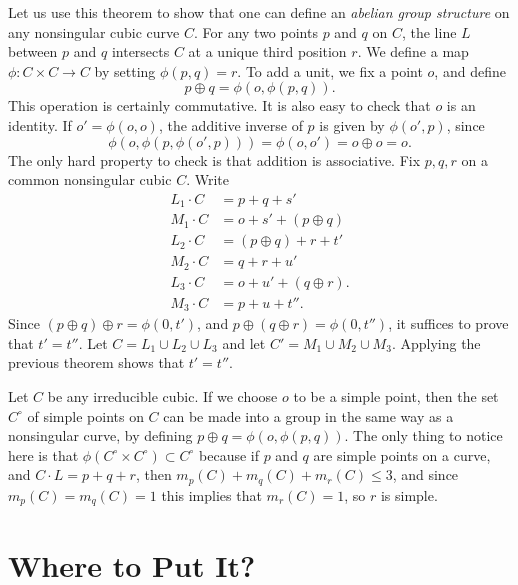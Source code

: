 Let us use this theorem to show that one can define an \emph{abelian group structure} on any nonsingular cubic curve $C$. For any two points $p$ and $q$ on $C$, the line $L$ between $p$ and $q$ intersects $C$ at a unique third position $r$. We define a map $\phi: C \times C \to C$ by setting $\phi(p,q) = r$. To add a unit, we fix a point $o$, and define
%
\[ p \oplus q = \phi(o,\phi(p,q)). \]
%
This operation is certainly commutative. It is also easy to check that $o$ is an identity. If $o' = \phi(o,o)$, the additive inverse of $p$ is given by $\phi(o',p)$, since
%
\[ \phi(o,\phi(p,\phi(o',p))) = \phi(o,o') = o \oplus o = o. \]
%
The only hard property to check is that addition is associative. Fix $p,q,r$ on a common nonsingular cubic $C$. Write
%
\begin{align*}
    L_1 \cdot C &= p + q + s'\\
    M_1 \cdot C &= o + s' + (p \oplus q)\\
    L_2 \cdot C &= (p \oplus q) + r + t'\\
    M_2 \cdot C &= q + r + u'\\
    L_3 \cdot C &= o + u' + (q \oplus r).\\
    M_3 \cdot C &= p + u + t''.
\end{align*}
%
Since $(p \oplus q) \oplus r = \phi(0,t')$, and $p \oplus (q \oplus r) = \phi(0,t'')$, it suffices to prove that $t' = t''$. Let $C = L_1 \cup L_2 \cup L_3$ and let $C' = M_1 \cup M_2 \cup M_3$. Applying the previous theorem shows that $t' = t''$.

\begin{remark}
    Let $C$ be any irreducible cubic. If we choose $o$ to be a simple point, then the set $C^\circ$ of simple points on $C$ can be made into a group in the same way as a nonsingular curve, by defining $p \oplus q = \phi(o,\phi(p,q))$. The only thing to notice here is that $\phi(C^\circ \times C^\circ) \subset C^\circ$ because if $p$ and $q$ are simple points on a curve, and $C \cdot L = p + q + r$, then $m_p(C) + m_q(C) + m_r(C) \leq 3$, and since $m_p(C) = m_q(C) = 1$ this implies that $m_r(C) = 1$, so $r$ is simple.
\end{remark}

















\chapter{Where to Put It?}

